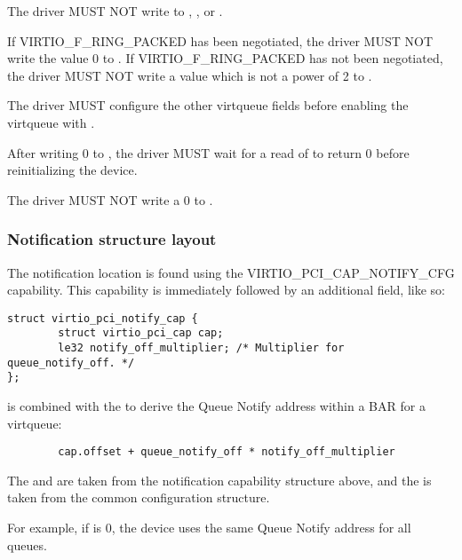 The driver MUST NOT write to , ,  or .

If VIRTIO_F_RING_PACKED has been negotiated,
the driver MUST NOT write the value 0 to .
If VIRTIO_F_RING_PACKED has not been negotiated,
the driver MUST NOT write a value which is not a power of 2 to .

The driver MUST configure the other virtqueue fields before enabling the virtqueue
with .

After writing 0 to , the driver MUST wait for a read of
 to return 0 before reinitializing the device.

The driver MUST NOT write a 0 to .

\subsubsection{Notification structure layout}\label{sec:Virtio Transport Options / Virtio Over PCI Bus / PCI Device Layout / Notification capability}

The notification location is found using the VIRTIO_PCI_CAP_NOTIFY_CFG
capability.  This capability is immediately followed by an additional
field, like so:

\begin{lstlisting}
struct virtio_pci_notify_cap {
        struct virtio_pci_cap cap;
        le32 notify_off_multiplier; /* Multiplier for queue_notify_off. */
};
\end{lstlisting}

 is combined with the  to
derive the Queue Notify address within a BAR for a virtqueue:

\begin{lstlisting}
        cap.offset + queue_notify_off * notify_off_multiplier
\end{lstlisting}

The  and  are taken from the
notification capability structure above, and the  is
taken from the common configuration structure.

\begin{note}
For example, if  is 0, the device uses
the same Queue Notify address for all queues.
\end{note}


